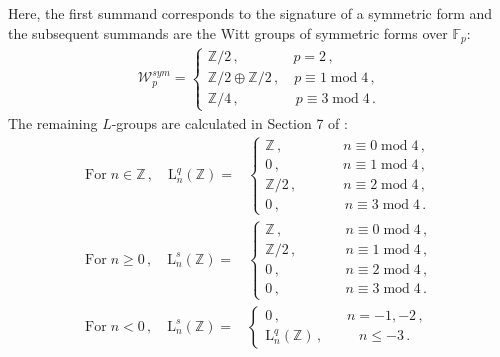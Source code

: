 \documentclass[sn-mathphys-num]{sn-jnl}
\theoremstyle{definition}
\numberwithin{equation}{section}
\theoremstyle{definition}
\def\CW {{\mathcal W}}
\def\L{{\mbox{L}}}
\def\IF{\mathbb{F}}
\def\IZ{{\mathbb{Z}}}
\begin{document}
Here, the first summand corresponds to the signature of a symmetric form and  the subsequent summands are the Witt groups of symmetric forms over $\IF_p$:
\begin{align}
   \CW^{sym}_p= \begin{cases}
         \IZ/2\,,\quad\quad\quad\;\;\; p=2\,,\\
        \IZ/2\oplus \IZ/2\,,\quad p\equiv 1\;\mbox{mod}\;4\,,\\
        \IZ/4\,,\quad\quad \quad\quad p\equiv 3\;\mbox{mod}\;4\,.
    \end{cases}
\end{align}
 The remaining $L$-groups are calculated in Section 7 of \cite{RanickiAlgThofSurgery1}:
\begin{align}
\mbox{For}\;n\in\IZ\,,\quad \L^q_n(\IZ)=&\begin{cases}
    \IZ\,,\quad\quad\quad\quad\; n\equiv 0\;\mbox{mod}\;4\,,\\
    0\,,\quad\quad\quad\quad\;\, n\equiv 1\;\mbox{mod}\;4\,,\\
    \IZ/2\,,\quad\quad\quad\; n\equiv 2\;\mbox{mod}\;4\,,\\
    0\,,\quad\quad\quad\quad\;\; n\equiv 3\;\mbox{mod}\;4\,.
\end{cases}\\
\mbox{For}\;n\geqslant0\,,\quad \L^s_n(\IZ)=& \begin{cases}
    \IZ\,,\quad\quad\quad\quad\;\, n\equiv 0\;\mbox{mod}\;4\,,\\
    \IZ/2\,,\quad\quad\quad\;\, n\equiv 1\;\mbox{mod}\;4\,,\\
0\,,\quad\quad\quad\quad\;\,\,n\equiv 2\;\mbox{mod}\;4\,,\\
    0\,,\quad\quad\quad\quad\;\,\, n\equiv 3\;\mbox{mod}\;4\,.
\end{cases}\\
\mbox{For}\;n<0\,,\quad \L^s_n(\IZ)=&\begin{cases}
    0\,,\quad\quad\quad\quad\;\;\, n=-1,-2\,,\\
    \L_n^q(\IZ)\,,\quad\quad\;\; n\leqslant -3\,.
\end{cases}
\end{align}
\end{document}
